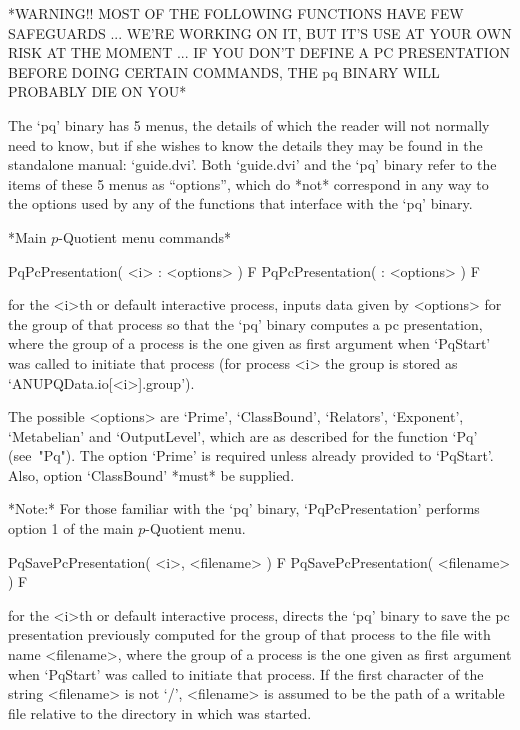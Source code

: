 
*WARNING!! MOST OF THE FOLLOWING FUNCTIONS HAVE FEW SAFEGUARDS ... WE'RE
 WORKING ON IT, BUT IT'S USE AT YOUR OWN RISK AT THE MOMENT ... IF YOU
 DON'T DEFINE A PC PRESENTATION BEFORE DOING CERTAIN COMMANDS, THE pq
 BINARY WILL PROBABLY DIE ON YOU*

The `pq' binary has 5 menus, the details of which  the  reader  will  not
normally need to know, but if she wishes to know the details they may  be
found in the standalone manual: `guide.dvi'.  Both  `guide.dvi'  and  the
`pq' binary refer to the items of these 5 menus as ``options'', which  do
*not* correspond in any way to the options used  by  any  of  the  {\GAP}
functions that interface with the `pq' binary.

*Main $p$-Quotient menu commands*

\>PqPcPresentation( <i> : <options> ) F
\>PqPcPresentation( : <options> ) F

for the <i>th or default interactive {\ANUPQ} process, inputs data  given
by <options> for the group of  that  process  so  that  the  `pq'  binary
computes a pc presentation, where the group of a process is the one given
as first argument when `PqStart' was called to initiate that process (for
process <i> the group is stored as `ANUPQData.io[<i>].group').

The possible <options> are `Prime', `ClassBound', `Relators', `Exponent',
`Metabelian' and `OutputLevel', which are as described for  the  function
`Pq' (see~"Pq"). The option `Prime' is required unless  already  provided
to `PqStart'. Also, option `ClassBound' *must* be supplied.

*Note:* For those  familiar  with  the  `pq'  binary,  `PqPcPresentation'
performs option 1 of the main $p$-Quotient menu.

\>PqSavePcPresentation( <i>, <filename> ) F
\>PqSavePcPresentation( <filename> ) F

for the <i>th or default interactive {\ANUPQ} process, directs  the  `pq'
binary to save the pc presentation previously computed for the  group  of
that process to the file with name  <filename>,  where  the  group  of  a
process is the one given as first argument when `PqStart' was  called  to
initiate that process. If the first character of the string <filename> is
not `/', <filename> is assumed to be the path of a writable file relative
to the directory in which {\GAP} was started.

